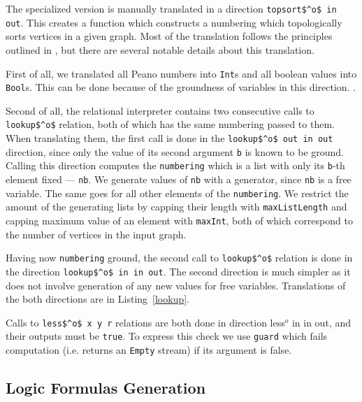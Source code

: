 The specialized version is manually translated in a direction \lstinline{topsort$^o$ in out}.
This creates a function which constructs a numbering which topologically sorts vertices in a given graph.
Most of the translation follows the principles outlined in , but there are several notable details about this translation.

First of all, we translated all Peano numbers into \lstinline{Int}s and all \mk boolean values into \lstinline{Bool}s.
This can be done because of the groundness of variables in this direction.
.

Second of all, the relational interpreter contains two consecutive calls to \lstinline{lookup$^o$} relation, both of which has the same numbering passed to them.
When translating them, the first call is done in the \lstinline{lookup$^o$ out in out} direction, since only the value of its second argument \lstinline{b} is known to be ground.
Calling this direction computes the \lstinline{numbering} which is a list with only its \lstinline{b}-th element fixed --- \lstinline{nb}.
We generate values of \lstinline{nb} with a generator, since \lstinline{nb} is a free variable.
The same goes for all other elements of the \lstinline{numbering}.
We restrict the amount of the generating lists by capping their length with \lstinline{maxListLength} and capping maximum value of an element with \lstinline{maxInt}, both of which correspond to the number of vertices in the input graph.

Having now \lstinline{numbering} ground, the second call to \lstinline{lookup$^o$} relation is done in the direction \lstinline{lookup$^o$ in in out}.
The second direction is much simpler as it does not involve generation of any new values for free variables.
Translations of the both directions are in Listing~\ref{lookup}.

Calls to \lstinline{less$^o$ x y r} relations are both done in direction {less$^o$ in in out}, and their outputs must be \lstinline{true}.
To express this check we use \lstinline{guard} which fails computation (i.e. returns an \lstinline{Empty} stream) if its argument is false.








\vspace{-0.8cm}

\subsection{Logic Formulas Generation}

